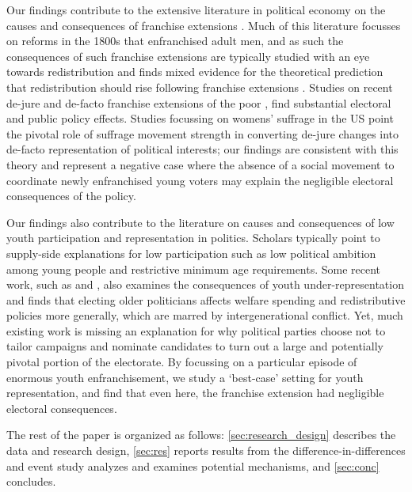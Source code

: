 Our findings contribute to the extensive literature in political
economy on the causes and consequences of franchise extensions
\parencite{acemogluTheoryPoliticalTransitions2001,aidt2013democratization,aidt2015democratization,berlinski2011political}.
Much of this literature focusses on reforms in the 1800s that
enfranchised adult men, and as such the consequences of such franchise
extensions are typically studied with an eye towards redistribution
and finds mixed evidence for the theoretical prediction that
redistribution should rise following franchise extensions
\parencite{Meltzer1981-gh}. Studies on recent de-jure and de-facto
franchise extensions of the poor
\parencite{fujiwaraVotingTechnologyPolitical2015,cassan2020enfranchisement},
find substantial electoral and public policy effects. Studies
focussing on womens' suffrage in the US
\parencite{Morgan-Collins2021-yq} point the pivotal role of suffrage
movement strength in converting de-jure changes into de-facto
representation of political interests; our findings are consistent
with this theory and represent a negative case where the absence of a
social movement to coordinate newly enfranchised young voters may
explain the negligible electoral consequences of the policy.

Our findings also contribute to the literature on causes and consequences
of low youth participation and representation in politics. Scholars
typically point to supply-side explanations for low participation such
as low political ambition among young people
\parencite{lawless2015running} and restrictive minimum age
requirements. Some recent work, such as \textcite{mcclean2021does} and
\textcite{curry2018lawmaker}, also examines the consequences of youth
under-representation and finds that electing older politicians affects
welfare spending and redistributive policies more generally, which are
marred by intergenerational conflict. Yet, much existing work is
missing an explanation for why political parties choose not to tailor
campaigns and nominate candidates to turn out a large and potentially
pivotal portion of the electorate. By focussing on a particular
episode of enormous youth enfranchisement, we study a `best-case'
setting for youth representation, and find that even here, the
franchise extension had negligible electoral consequences.

The rest of the paper is organized as follows:
\ref{sec:research_design} describes the data and research design,
\ref{sec:res} reports results from the difference-in-differences and
event study analyzes and examines potential mechanisms, and
\ref{sec:conc} concludes.


